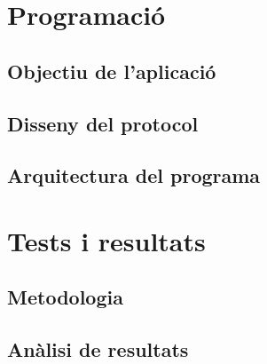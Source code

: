\section{Programació}
\subsection{Objectiu de l'aplicació}
\subsection{Disseny del protocol}
\subsection{Arquitectura del programa}
\section{Tests i resultats}
\subsection{Metodologia}
\subsection{Anàlisi de resultats}
